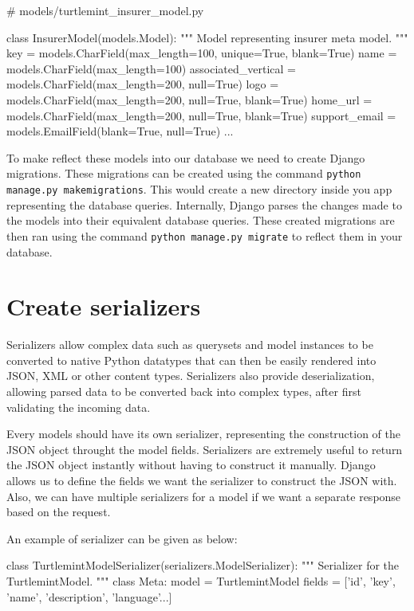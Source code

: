 \begin{pythoncode}
# models/turtlemint_insurer_model.py
    
class InsurerModel(models.Model):
    """
    Model representing insurer meta model.
    """
    key = models.CharField(max_length=100, unique=True, blank=True)
    name = models.CharField(max_length=100)
    associated_vertical = models.CharField(max_length=200, null=True)
    logo = models.CharField(max_length=200, null=True, blank=True)
    home_url = models.CharField(max_length=200, null=True, blank=True)
    support_email = models.EmailField(blank=True, null=True)
    ...
\end{pythoncode}

To make reflect these models into our database we need to create Django
migrations. These migrations can be created using the command
\texttt{python manage.py makemigrations}. This would create a new directory
inside you app representing the database queries. Internally, Django parses
the changes made to the models into their equivalent database queries. These
created migrations are then ran using the command
\texttt{python manage.py migrate} to reflect them in your database.

\section{Create serializers}
Serializers allow complex data such as querysets and model instances to be
converted to native Python datatypes that can then be easily rendered into
JSON, XML or other content types. Serializers also provide deserialization,
allowing parsed data to be converted back into complex types, after first
validating the incoming data.

Every models should have its own serializer, representing the construction of
the JSON object throught the model fields. Serializers are extremely useful
to return the JSON object instantly without having to construct it manually.
Django allows us to define the fields we want the serializer to construct the
JSON with. Also, we can have multiple serializers for a model if we want a
separate response based on the request.

An example of serializer can be given as below:
\begin{pythoncode}
class TurtlemintModelSerializer(serializers.ModelSerializer):
    """
    Serializer for the TurtlemintModel.
    """
    class Meta:
        model = TurtlemintModel
        fields = ['id', 'key', 'name', 'description', 'language'...]
\end{pythoncode}

